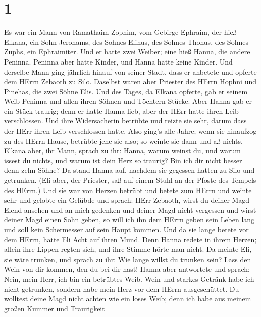 \hypertarget{section}{%
\section{1}\label{section}}

 Es war ein Mann von Ramathaim-Zophim, vom Gebirge Ephraim,
der hieß Elkana, ein Sohn Jerohams, des Sohnes Elihus, des Sohnes
Thohus, des Sohnes Zuphs, ein Ephraimiter.  Und er hatte
zwei Weiber; eine hieß Hanna, die andere Peninna. Peninna aber hatte
Kinder, und Hanna hatte keine Kinder.  Und derselbe Mann
ging jährlich hinauf von seiner Stadt, dass er anbetete und opferte dem
HErrn Zebaoth zu Silo. Daselbst waren aber Priester des HErrn Hophni und
Pinehas, die zwei Söhne Elis.  Und des Tages, da Elkana
opferte, gab er seinem Weib Peninna und allen ihren Söhnen und Töchtern
Stücke.  Aber Hanna gab er ein Stück traurig; denn er hatte
Hanna lieb, aber der HErr hatte ihren Leib verschlossen. 
Und ihre Widersacherin betrübte und reizte sie sehr, darum dass der HErr
ihren Leib verschlossen hatte.  Also ging's alle Jahre; wenn
sie hinaufzog zu des HErrn Hause, betrübte jene sie also; so weinte sie
dann und aß nichts.  Elkana aber, ihr Mann, sprach zu ihr:
Hanna, warum weinst du, und warum issest du nichts, und warum ist dein
Herz so traurig? Bin ich dir nicht besser denn zehn Söhne? 
Da stand Hanna auf, nachdem sie gegessen hatten zu Silo und getrunken.
(Eli aber, der Priester, saß auf einem Stuhl an der Pfoste des Tempels
des HErrn.)  Und sie war von Herzen betrübt und betete zum
HErrn und weinte sehr  und gelobte ein Gelübde und sprach:
HErr Zebaoth, wirst du deiner Magd Elend ansehen und an mich gedenken
und deiner Magd nicht vergessen und wirst deiner Magd einen Sohn geben,
so will ich ihn dem HErrn geben sein Leben lang und soll kein
Schermesser auf sein Haupt kommen.  Und da sie lange betete
vor dem HErrn, hatte Eli Acht auf ihren Mund.  Denn Hanna
redete in ihrem Herzen; allein ihre Lippen regten sich, und ihre Stimme
hörte man nicht. Da meinte Eli, sie wäre trunken,  und
sprach zu ihr: Wie lange willst du trunken sein? Lass den Wein von dir
kommen, den du bei dir hast!  Hanna aber antwortete und
sprach: Nein, mein Herr, ich bin ein betrübtes Weib. Wein und starkes
Getränk habe ich nicht getrunken, sondern habe mein Herz vor dem HErrn
ausgeschüttet.  Du wolltest deine Magd nicht achten wie ein
loses Weib; denn ich habe aus meinem großen Kummer und Traurigkeit
